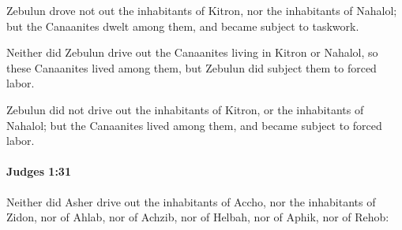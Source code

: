 			\begin{versebox}
					\item[BHS] 
					\item[ASV] Zebulun drove not out the inhabitants of Kitron, nor the inhabitants of Nahalol; but the Canaanites dwelt among them, and became subject to taskwork.
					\item[NIV] Neither did Zebulun drive out the Canaanites living in Kitron or Nahalol, so these Canaanites lived among them, but Zebulun did subject them to forced labor.
					\item[NRSV] Zebulun did not drive out the inhabitants of Kitron, or the inhabitants of Nahalol; but the Canaanites lived among them, and became subject to forced labor.
			\end{versebox}

		\paragraph{Judges 1:31} %
			\label{JUDGES-1-31}

			Neither did Asher drive out the inhabitants of Accho, nor the inhabitants of Zidon, nor of Ahlab, nor of Achzib, nor of Helbah, nor of Aphik, nor of Rehob:


